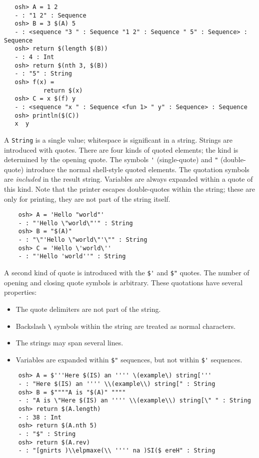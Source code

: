 \begin{verbatim}
   osh> A = 1 2
   - : "1 2" : Sequence
   osh> B = 3 $(A) 5
   - : <sequence "3 " : Sequence "1 2" : Sequence " 5" : Sequence> : Sequence
   osh> return $(length $(B))
   - : 4 : Int
   osh> return $(nth 3, $(B))
   - : "5" : String
   osh> f(x) =
           return $(x)
   osh> C = x $(f) y
   - : <sequence "x " : Sequence <fun 1> " y" : Sequence> : Sequence
   osh> println($(C))
   x  y
\end{verbatim}

A \verb+String+ is a single value; whitespace is significant in a
string.  Strings are introduced with quotes.  There are four kinds of
quoted elements; the kind is determined by the opening quote.  The
symbols \verb+'+ (single-quote) and \verb+"+ (double-quote) introduce
the normal shell-style quoted elements.  The quotation symbols are
\emph{included} in the result string.  Variables are always expanded
within a quote of this kind.  Note that the  printer
escapes double-quotes within the string; these are only for printing, they
are not part of the string itself.

\begin{verbatim}
    osh> A = 'Hello "world"'
    - : "'Hello \"world\"'" : String
    osh> B = "$(A)"
    - : "\"'Hello \"world\"'\"" : String
    osh> C = 'Hello \'world\''
    - : "'Hello 'world''" : String
\end{verbatim}

A second kind of quote is introduced with the \verb+$'+ and \verb+$"+
quotes.  The number of opening and closing quote symbols is arbitrary.
These quotations have several properties:
\begin{itemize}
\item The quote delimiters are not part of the string.
\item Backslash \verb+\+ symbols within the string are treated as normal characters.
\item The strings may span several lines.
\item Variables are expanded within \verb+$"+ sequences, but not within \verb+$'+
  sequences.
\end{itemize}

\begin{verbatim}
    osh> A = $'''Here $(IS) an '''' \(example\) string['''
    - : "Here $(IS) an '''' \\(example\\) string[" : String
    osh> B = $""""A is "$(A)" """"
    - : "A is \"Here $(IS) an '''' \\(example\\) string[\" " : String
    osh> return $(A.length)
    - : 38 : Int
    osh> return $(A.nth 5)
    - : "$" : String
    osh> return $(A.rev)
    - : "[gnirts )\\elpmaxe(\\ '''' na )SI($ ereH" : String
\end{verbatim}

